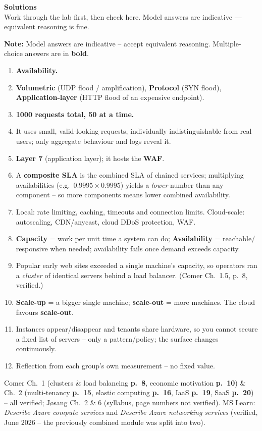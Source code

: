 \documentclass[11pt]{article}
\begin{document}
\signoff

\clearpage
\solheader
{\LARGE\bfseries\color{kred} Solutions}\\[2pt]
{\small Work through the lab first, then check here. Model answers are indicative — equivalent reasoning is fine.}\par\vspace{8pt}
\noindent\textbf{Note:} Model answers are indicative -- accept equivalent reasoning. Multiple-choice
answers are in \textbf{bold}.

\begin{enumerate}
\item \textbf{Availability.}
\item \textbf{Volumetric} (UDP flood / amplification), \textbf{Protocol} (SYN flood),
      \textbf{Application-layer} (HTTP flood of an expensive endpoint).
\item \textbf{1000 requests total, 50 at a time.}
\item It uses small, valid-looking requests, individually indistinguishable from real users; only
      aggregate behaviour and logs reveal it.
\item \textbf{Layer 7} (application layer); it hosts the \textbf{WAF}.
\item A \textbf{composite SLA} is the combined SLA of chained services; multiplying availabilities
      (e.g.\ $0.9995\times0.9995$) yields a \emph{lower} number than any component -- so more
      components means lower combined availability.
\item Local: rate limiting, caching, timeouts and connection limits. Cloud-scale: autoscaling,
      CDN/anycast, cloud DDoS protection, WAF.
\item \textbf{Capacity} = work per unit time a system can do; \textbf{Availability} = reachable/
      responsive when needed; availability fails once demand exceeds capacity.
\item Popular early web sites exceeded a single machine's capacity, so operators ran a \emph{cluster}
      of identical servers behind a load balancer. (Comer Ch.~1.5, p.~8, verified.)
\item \textbf{Scale-up} = a bigger single machine; \textbf{scale-out} = more machines. The cloud
      favours \textbf{scale-out}.
\item Instances appear/disappear and tenants share hardware, so you cannot secure a fixed list of
      servers -- only a pattern/policy; the surface changes continuously.
\item Reflection from each group's own measurement -- no fixed value.
\end{enumerate}

Comer Ch.~1 (clusters \& load balancing \textbf{p.~8}, economic motivation \textbf{p.~10}) \& Ch.~2
(multi-tenancy \textbf{p.~15}, elastic computing \textbf{p.~16}, IaaS \textbf{p.~19}, SaaS
\textbf{p.~20}) -- all verified; J\o sang Ch.~2 \& 6 (syllabus, page numbers not verified). MS Learn:
\emph{Describe Azure compute services} and \emph{Describe Azure networking services} (verified, June
2026 -- the previously combined module was split into two).
\end{document}
